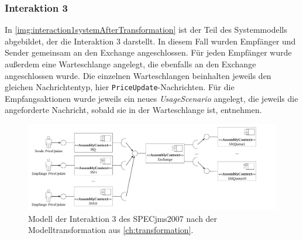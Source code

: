 \subsubsection{Interaktion 3}
In \autoref{img:interaction1systemAfterTransformation} ist der Teil des Systemmodells abgebildet, der die Interaktion 3 darstellt. In diesem Fall wurden Empfänger und Sender gemeinsam an den Exchange angeschlossen. Für jeden Empfänger wurde außerdem eine Warteschlange angelegt, die ebenfalls an den Exchange angeschlossen wurde. Die einzelnen Warteschlangen beinhalten jeweils den gleichen Nachrichtentyp, hier \texttt{PriceUpdate}-Nachrichten. Für die Empfangsaktionen wurde jeweils ein neues \emph{UsageScenario} angelegt, die jeweils die angeforderte Nachricht, sobald sie in der Warteschlange ist, entnehmen.
\begin{figure}
\center
  \includegraphics[width=1.4\textwidth,angle=90]{images/evaluation/specjms/evaluationInteraktion3new.pdf}
  \caption{Modell der Interaktion 3 des SPECjms2007 nach der Modelltransformation aus \autoref{ch:transformation}.}
  \label{img:interaction3systemAfterTransformation}
\end{figure}



